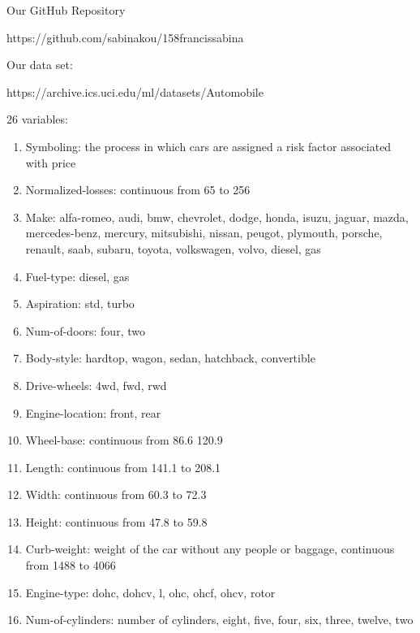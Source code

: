 \documentclass{article}\usepackage[]{graphicx}\usepackage[]{color}
\begin{document}
Our GitHub Repository

https://github.com/sabinakou/158francissabina

Our data set:

https://archive.ics.uci.edu/ml/datasets/Automobile

26 variables:

\begin{enumerate}

\item Symboling: the process in which cars are assigned a risk factor associated with price

\item Normalized-losses: continuous from 65 to 256

\item Make: alfa-romeo, audi, bmw, chevrolet, dodge, honda, isuzu, jaguar, mazda, mercedes-benz, mercury, mitsubishi, nissan, peugot, plymouth, porsche, renault, saab, subaru, toyota, volkswagen, volvo, diesel, gas

\item Fuel-type: diesel, gas

\item Aspiration: std, turbo

\item Num-of-doors: four, two 

\item Body-style: hardtop, wagon, sedan, hatchback, convertible

\item Drive-wheels: 4wd, fwd, rwd

\item Engine-location: front, rear

\item Wheel-base: continuous from 86.6 120.9

\item Length: continuous from 141.1 to 208.1

\item Width: continuous from 60.3 to 72.3

\item Height: continuous from 47.8 to 59.8

\item Curb-weight: weight of the car without any people or baggage, continuous from 1488 to 4066

\item Engine-type: dohc, dohcv, l, ohc, ohcf, ohcv, rotor

\item Num-of-cylinders: number of cylinders, eight, five, four, six, three, twelve, two


\end{enumerate}
\end{document}
